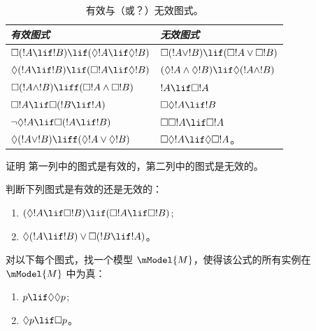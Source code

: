 \documentclass[../../../include/open-logic-section]{subfiles}
\begin{document}
\begin{table}[t]
    \centering
    \begin{tabular}{| l || l |}
      \hline
      {\emph{有效图式}} & {\emph{无效图式}} \\
      \hline\hline
      $\Box(!A \lif !B) \lif (\Diamond !A \lif \Diamond !B)$
      & $\Box (!A \lor !B) \lif (\Box !A \lor \Box !B)$ \\
      $\Diamond (!A \lif !B) \lif (\Box !A \lif \Diamond
      !B)$
      & $(\Diamond !A \land \Diamond !B) \lif \Diamond (!A
      \land !B)$\\
      $\Box (!A \land !B) \liff (\Box !A \land \Box !B)$
      & $!A \lif \Box !A$ \\
      $\Box !A \lif \Box (!B \lif !A)$
      & $\Box \Diamond !A \lif !B$ \\
      $\lnot \Diamond !A \lif \Box (!A \lif !B)$
      & $\Box \Box !A \lif \Box !A$ \\
      $\Diamond (!A \lor !B) \liff (\Diamond !A \lor
      \Diamond !B)$
      & $\Box \Diamond !A \lif \Diamond \Box !A$。 \\
      \hline
    \end{tabular}
    \caption{有效与（或？）无效图式。}
\end{table}

\begin{prob}%
  证明  第一列中的图式是有效的，第二列中的图式是无效的。
\end{prob}

\begin{prob}
  判断下列图式是有效的还是无效的：
  \begin{enumerate}
  \item $(\Diamond !A \lif \Box !B) \lif (\Box !A \lif \Box
    !B)$;
  \item $\Diamond(!A \lif !B) \lor \Box(!B \lif !A)$。
  \end{enumerate}
\end{prob}

\begin{prob}
  对以下每个图式，找一个模型 $\mModel{M}$，使得该公式的所有实例在 $\mModel{M}$ 中为真：
  \begin{enumerate}
  \item $p \lif \Diamond\Diamond p$;
  \item $\Diamond p \lif \Box p$。
  \end{enumerate}
\end{prob}
\end{document}
